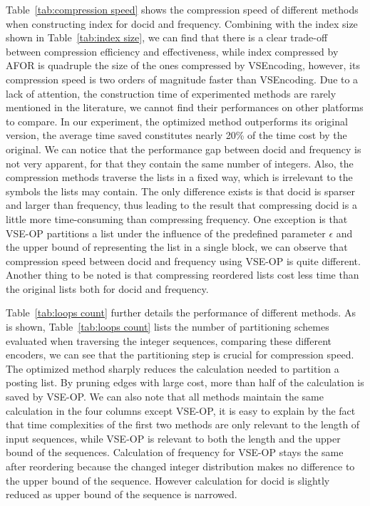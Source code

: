 \documentclass[runningheads,a4paper]{llncs}
\begin{document}
Table~\ref{tab:compression speed} shows the compression speed of different methods when constructing index for docid and frequency. Combining with the index size shown in Table~\ref{tab:index size}, we can find that there is a clear trade-off between compression efficiency and effectiveness, while index compressed by AFOR is quadruple the size of the ones compressed by VSEncoding, however, its compression speed is two orders of magnitude faster than VSEncoding. Due to a lack of attention, the construction time of experimented methods are rarely mentioned in the literature, we cannot find their performances on other platforms to compare. In our experiment, the optimized method outperforms its original version, the average time saved constitutes nearly 20\% of the time cost by the original. We can notice that the performance gap between docid and frequency is not very apparent, for that they contain the same number of integers. Also, the compression methods traverse the lists in a fixed way, which is irrelevant to the symbols the lists may contain. The only difference exists is that docid is sparser and larger than frequency, thus leading to the result that compressing docid is a little more time-consuming than compressing frequency. One exception is that VSE-OP partitions a list under the influence of the predefined parameter $\epsilon$ and the upper bound of representing the list in a single block, we can observe that compression speed between docid and frequency using VSE-OP is quite different. Another thing to be noted is that compressing reordered lists cost less time than the original lists both for docid and frequency.

Table~\ref{tab:loops count} further details the performance of different methods. As is shown, Table~\ref{tab:loops count} lists the number of partitioning schemes evaluated when traversing the integer sequences, comparing these different encoders, we can see that the partitioning step is crucial for compression speed. The optimized method sharply reduces the calculation needed to partition a posting list. By pruning edges with large cost, more than half of the calculation is saved by VSE-OP. We can also note that all methods maintain the same calculation in the four columns except VSE-OP, it is easy to explain by the fact that time complexities of the first two methods are only relevant to the length of input sequences, while VSE-OP is relevant to both the length and the upper bound of the sequences. Calculation of frequency for VSE-OP stays the same after reordering because the changed integer distribution makes no difference to the upper bound of the sequence. However calculation for docid is slightly reduced as upper bound of the sequence is narrowed.
\end{document}
